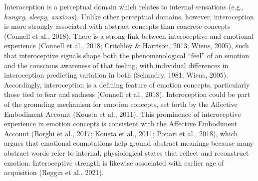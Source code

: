 \documentclass[
  man,floatsintext]{apa6}
\begin{document}
Interoception is a perceptual domain which relates to internal sensations (e.g., \emph{hungry}, \emph{sleepy}, \emph{anxious}). Unlike other perceptual domains, however, interoception is more strongly associated with abstract concepts than concrete concepts (Connell et al., 2018). There is a strong link between interoceptive and emotional experience (Connell et al., 2018; Critchley \& Harrison, 2013; Wiens, 2005), such that interoceptive signals shape both the phenomenological ``feel'' of an emotion and the conscious awareness of that feeling, with individual differences in interoception predicting variation in both (Schandry, 1981; Wiens, 2005). Accordingly, interoception is a defining feature of emotion concepts, particularly those tied to fear and sadness (Connell et al., 2018). Interoception could be part of the grounding mechanism for emotion concepts, set forth by the Affective Embodiment Account (Kousta et al., 2011). This prominence of interoceptive experience in emotion concepts is consistent with the Affective Embodiment Account (Borghi et al., 2017; Kousta et al., 2011; Ponari et al., 2018), which argues that emotional connotations help ground abstract meanings because many abstract words refer to internal, physiological states that reflect and reconstruct emotion. Interoceptive strength is likewise associated with earlier age of acquisition (Reggin et al., 2021).
\end{document}
